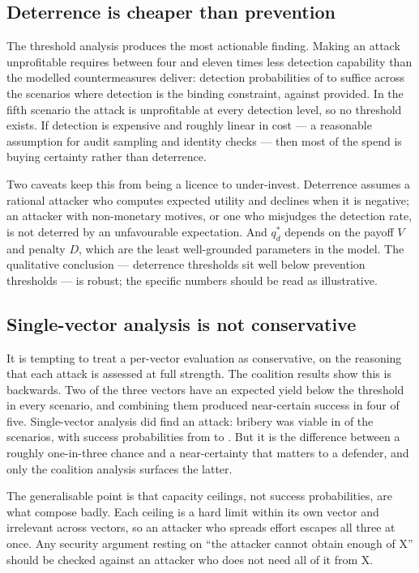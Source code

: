 \documentclass[11pt,a4paper]{article}
\begin{document}
\subsection{Deterrence is cheaper than prevention}

The threshold analysis produces the most actionable finding. Making an attack
unprofitable requires between four and eleven times less detection capability than the
modelled countermeasures deliver: detection probabilities of \CriticalDetectionMin{} to
\CriticalDetectionMax{} suffice across the \CriticalDetectionBindingCount{} scenarios
where detection is the binding constraint, against \ProtectedQ{} provided. In the fifth
scenario the attack is unprofitable at every detection level, so no threshold exists. If detection is expensive and
roughly linear in cost --- a reasonable assumption for audit sampling and identity
checks --- then most of the spend is buying certainty rather than deterrence.

Two caveats keep this from being a licence to under-invest. Deterrence assumes a
rational attacker who computes expected utility and declines when it is negative; an
attacker with non-monetary motives, or one who misjudges the detection rate, is not
deterred by an unfavourable expectation. And $q_d^{*}$ depends on the payoff $V$ and
penalty $D$, which are the least well-grounded parameters in the model. The
qualitative conclusion --- deterrence thresholds sit well below prevention thresholds
--- is robust; the specific numbers should be read as illustrative.

\subsection{Single-vector analysis is not conservative}

It is tempting to treat a per-vector evaluation as conservative, on the reasoning that
each attack is assessed at full strength. The coalition results show this is backwards.
Two of the three vectors have an expected yield below the threshold in every scenario,
and combining them produced near-certain success in four of five. Single-vector analysis
did find an attack: bribery was viable in \BestPureViableCount{} of the
\CoalitionScenarioCount{} scenarios, with success probabilities from \BestPureMin{} to
\BestPureMax{}. But it is the difference between a roughly one-in-three chance and a
near-certainty that matters to a defender, and only the coalition analysis surfaces the
latter.

The generalisable point is that capacity ceilings, not success probabilities, are what
compose badly. Each ceiling is a hard limit within its own vector and irrelevant across
vectors, so an attacker who spreads effort escapes all three at once. Any security
argument resting on ``the attacker cannot obtain enough of X'' should be checked against
an attacker who does not need all of it from X.
\end{document}
